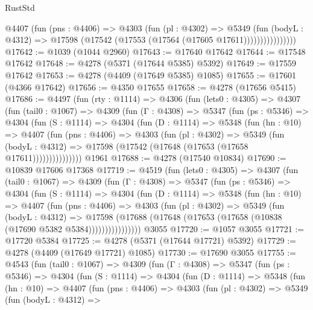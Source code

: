 \begin{lexlean}{RustStd}
\begin{coremodule}
                    @4407
                      (fun (pns : @4406) =>
                      @4303
                        (fun (pl : @4302) =>
                        @5349
                          (fun (bodyL : @4312) =>
                          @17598 (@17542 (@17553 (@17564 (@17605 @17611))))))))))))))))
@17642 := @1039 (@1044 @2960)
@17643 := @17640 @17642
@17644 := @17548 @17642
@17648 := @4278 (@5371 (@17644 @5385) @5392)
@17649 := @17559 @17642
@17653 := @4278 (@4409 (@17649 @5385) @1085)
@17655 := @17601 (@4366 @17642)
@17656 := @4350 @17655
@17658 := @4278 (@17656 @5415)
@17686 := @4497
    (fun (rty : @1114) =>
    @4306
      (fun (lets0 : @4305) =>
      @4307
        (fun (tail0 : @1067) =>
        @4309
          (fun (Γ : @4308) =>
          @5347
            (fun (ps : @5346) =>
            @4304
              (fun (S : @1114) =>
              @4304
                (fun (D : @1114) =>
                @5348
                  (fun (hn : @10) =>
                  @4407
                    (fun (pns : @4406) =>
                    @4303
                      (fun (pl : @4302) =>
                      @5349
                        (fun (bodyL : @4312) =>
                        @17598 (@17542 (@17648 (@17653 (@17658 @17611)))))))))))))))
    @1961
@17688 := @4278 (@17540 @10834)
@17690 := @10839 @17606 @17368
@17719 := @4519
    (fun (lets0 : @4305) =>
    @4307
      (fun (tail0 : @1067) =>
      @4309
        (fun (Γ : @4308) =>
        @5347
          (fun (ps : @5346) =>
          @4304
            (fun (S : @1114) =>
            @4304
              (fun (D : @1114) =>
              @5348
                (fun (hn : @10) =>
                @4407
                  (fun (pns : @4406) =>
                  @4303
                    (fun (pl : @4302) =>
                    @5349
                      (fun (bodyL : @4312) =>
                      @17598
                        (@17688 (@17648 (@17653 (@17658 (@10838 (@17690 @5382 @5384))))))))))))))))
    @3055
@17720 := @1057 @3055
@17721 := @17720 @5384
@17725 := @4278 (@5371 (@17644 @17721) @5392)
@17729 := @4278 (@4409 (@17649 @17721) @1085)
@17730 := @17690 @3055
@17755 := @4543
    (fun (tail0 : @1067) =>
    @4309
      (fun (Γ : @4308) =>
      @5347
        (fun (ps : @5346) =>
        @4304
          (fun (S : @1114) =>
          @4304
            (fun (D : @1114) =>
            @5348
              (fun (hn : @10) =>
              @4407
                (fun (pns : @4406) =>
                @4303
                  (fun (pl : @4302) =>
                  @5349
                    (fun (bodyL : @4312) =>

\end{coremodule}
\end{lexlean}
